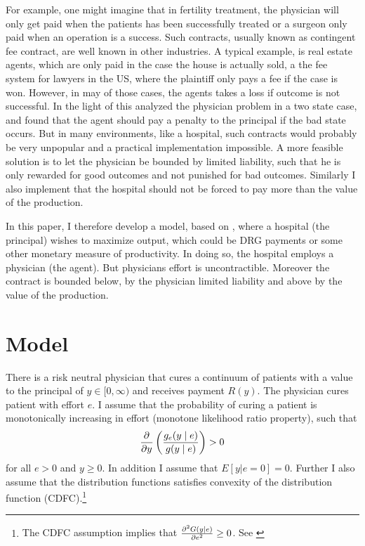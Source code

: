 For example, one might imagine that in fertility treatment, the physician will only get paid when the patients has been successfully treated or a surgeon only paid when an operation is a success. Such contracts, usually known as contingent fee contract, are well known in other industries. A typical example, is real estate agents, which are only paid in the case the house is actually sold, a the fee system for lawyers in the US, where the plaintiff only pays a fee if the case is won. However, in may of those cases, the agents takes a loss if outcome is not successful. In the light of this \textcite{Lambert2005No} analyzed the physician problem in a two state case, and found that the agent should pay a penalty to the principal if the bad state occurs. But in many environments, like a hospital, such contracts would probably be very unpopular and a practical implementation impossible. A more feasible solution is to let the physician be bounded by limited liability, such that he is only rewarded for good outcomes and not punished for bad outcomes. Similarly I also implement that the hospital should not be forced to pay more than the value of the production.  

In this paper, I therefore develop a model, based on \textcite{Innes1990Limited}, where a hospital (the principal) wishes to maximize output, which could be DRG payments or some other monetary measure of productivity. In doing so, the hospital employs a physician (the agent). But physicians effort is uncontractible. Moreover the contract is bounded below, by the physician limited liability and above by the value of the production. 
\section{Model} %
\label{sec:model}
There is a risk neutral physician that cures a continuum of patients with a value to the principal of $y\in[0,\infty)$ and receives payment $R(y)$. The physician cures patient with effort $e$. I assume that the probability of curing a patient is monotonically increasing in effort (monotone likelihood ratio property), such that 
\begin{align}
    \pder{y}\left(\frac{g_e(y\mid e)}{g(y\mid e)}\right)>0 \label{eq:mlrp}
\end{align}
for all $e>0$ and $y\ge 0$. In addition I assume that $E[y|e=0]=0$. Further I also assume that the distribution functions satisfies convexity of the distribution function (CDFC).\footnote{The CDFC assumption implies that $\pder[G(y|e)][2]{e}\geq0$. See \textcite[][p. 1362]{Rogerson1985FirstOrder}}

